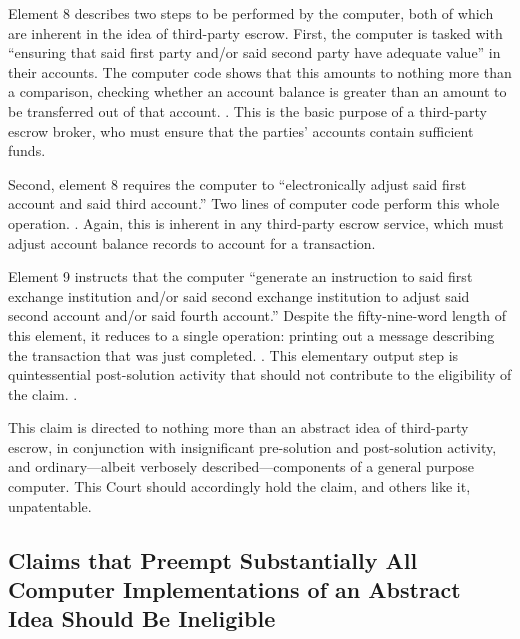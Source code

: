 \documentclass{scotus}
\begin{document}
Element 8 describes two steps to be performed by the computer, both of which are
inherent in the idea of third-party escrow. First, the computer is tasked with
``ensuring that said first party and/or said second party have adequate value''
in their accounts. The computer code shows that this amounts to nothing more
than a comparison, checking whether an account balance is greater than an amount
to be transferred out of that account. . This is the basic purpose of a third-party escrow broker, who
must ensure that the parties' accounts contain sufficient funds.

Second, element 8 requires the computer to ``electronically adjust said first
account and said third account.'' Two lines of computer
code perform this whole operation.
. Again, this
is inherent in any third-party escrow service, which must adjust account balance
records to account for a transaction.

Element 9 instructs that the computer ``generate an instruction to said first
exchange institution and/or said second exchange institution to adjust said
second account and/or said fourth account.'' Despite the fifty-nine-word length
of this element, it reduces to a single operation: printing out a
message describing the transaction that was just completed. . This elementary output step is quintessential
post-solution activity
that should not contribute to the eligibility of the claim. .

This claim is directed to nothing more than an abstract idea of
third-party escrow, in conjunction with insignificant pre-solution and
post-solution activity, and ordinary---albeit verbosely described---components
of
a general purpose computer.
This Court should accordingly hold the claim, and others like it, unpatentable.



%
%
\subsection{Claims that Preempt Substantially All Computer Implementations of an
Abstract Idea Should Be Ineligible}

\iffalse
A patent claim with the ``practical effect'' of removing an abstract idea from
the public domain is ineligible under \inline{101}. \sentence{see benson at
71-72}.
Claim 26 of the '375 patent would have the practical effect of removing all uses
of an abstract idea \emph{implemented on a general-purpose computer} from the
public domain.
\fi
\end{document}
